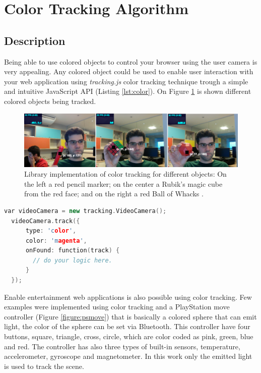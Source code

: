 

\section{Color Tracking Algorithm} %
\label{sec:evaluation:color_tracking_algorithm}

\subsection{Description} %
\label{sub:evaluation:results:color_tracking_algorithm:description}

Being able to use colored objects to control your browser using the user camera is very appealing. Any colored object could be used to enable user interaction with your web application using \textit{tracking.js} color tracking technique trough a simple and intuitive JavaScript API (Listing \ref{lst:color}). On Figure \ref{figure:color_object} is shown different colored objects being tracked.

\begin{figure}[!htb]
  \centering
  \includegraphics[width=\linewidth]{chapters/evaluation/color_object.png}
  \caption{Library implementation of color tracking for different objects: On the left a red pencil marker; on the center a Rubik's magic cube \cite{Rubiks2013} from the red face; and on the right a red Ball of Whacks \cite{Whack2013}.}
  \label{figure:color_object}
\end{figure}

\begin{lstlisting}[language=C++,label={lst:color},caption=Example of \textit{tracking.js} color API.]
  var videoCamera = new tracking.VideoCamera();
  videoCamera.track({
      type: 'color',
      color: 'magenta',
      onFound: function(track) {
        // do your logic here.
      }
  });
\end{lstlisting}

Enable entertainment web applications is also possible using color tracking. Few examples were implemented using color tracking and a PlayStation move controller (Figure \ref{figure:psmove}) that is basically a colored sphere that can emit light, the color of the sphere can be set via Bluetooth. This controller have four buttons, square, triangle, cross, circle, which are color coded as pink, green, blue and red. The controller has also three types of built-in sensors, temperature, accelerometer, gyroscope and magnetometer. In this work only the emitted light is used to track the scene.

